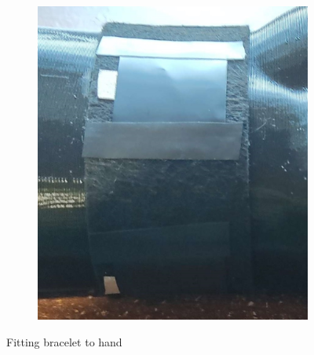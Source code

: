 \documentclass[11pt, a4paper]{article}
\begin{document}
\begin{figure}[h]
\begin{subfigure}[c]{0.3\textwidth}
		\includegraphics[scale=.037]{assets/crop_sensor_fitting.jpg}
		\label{fig:Initial_drawing6}
	\end{subfigure}
	\caption{Fitting bracelet to hand}
\end{figure}

\newpage
\end{document}
